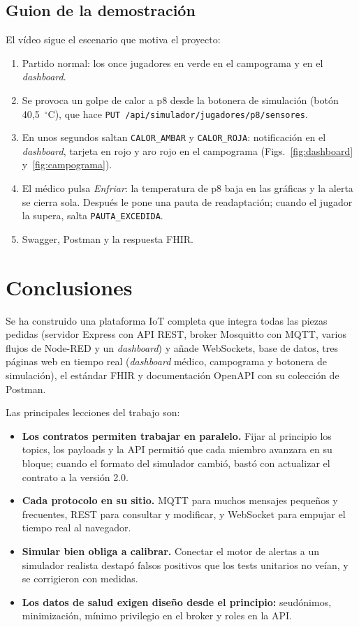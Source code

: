\documentclass[runningheads]{llncs}
\begin{document}
\subsection{Guion de la demostración}

El vídeo sigue el escenario que motiva el proyecto:

\begin{enumerate}
  \item Partido normal: los once jugadores en verde en el campograma y en el \emph{dashboard}.
  \item Se provoca un golpe de calor a p8 desde la botonera de simulación (botón 40,5~$^\circ$C), que hace \texttt{PUT /api/simulador/jugadores/p8/sensores}.
  \item En unos segundos saltan \texttt{CALOR\_AMBAR} y \texttt{CALOR\_ROJA}: notificación en el \emph{dashboard}, tarjeta en rojo y aro rojo en el campograma (Figs.~\ref{fig:dashboard} y~\ref{fig:campograma}).
  \item El médico pulsa \emph{Enfriar}: la temperatura de p8 baja en las gráficas y la alerta se cierra sola. Después le pone una pauta de readaptación; cuando el jugador la supera, salta \texttt{PAUTA\_EXCEDIDA}.
  \item Swagger, Postman y la respuesta FHIR.
\end{enumerate}

\section{Conclusiones}

Se ha construido una plataforma IoT completa que integra todas las piezas pedidas (servidor Express con API REST, broker Mosquitto con MQTT, varios flujos de Node-RED y un \emph{dashboard}) y añade WebSockets, base de datos, tres páginas web en tiempo real (\emph{dashboard} médico, campograma y botonera de simulación), el estándar FHIR y documentación OpenAPI con su colección de Postman.

Las principales lecciones del trabajo son:

\begin{itemize}
  \item \textbf{Los contratos permiten trabajar en paralelo.} Fijar al principio los topics, los payloads y la API permitió que cada miembro avanzara en su bloque; cuando el formato del simulador cambió, bastó con actualizar el contrato a la versión 2.0.
  \item \textbf{Cada protocolo en su sitio.} MQTT para muchos mensajes pequeños y frecuentes, REST para consultar y modificar, y WebSocket para empujar el tiempo real al navegador.
  \item \textbf{Simular bien obliga a calibrar.} Conectar el motor de alertas a un simulador realista destapó falsos positivos que los tests unitarios no veían, y se corrigieron con medidas.
  \item \textbf{Los datos de salud exigen diseño desde el principio:} seudónimos, minimización, mínimo privilegio en el broker y roles en la API.
\end{itemize}
\end{document}

